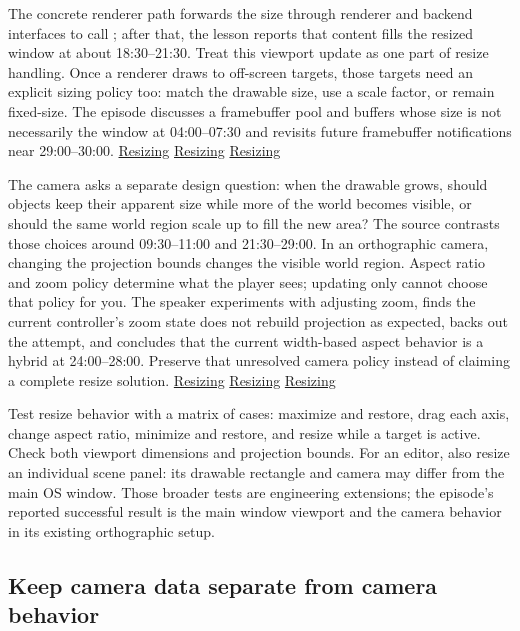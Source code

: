 The concrete renderer path forwards the size through renderer and backend interfaces to call ; after that, the lesson reports that content fills the resized window at about 18:30--21:30. Treat this viewport update as one part of resize handling. Once a renderer draws to off-screen targets, those targets need an explicit sizing policy too: match the drawable size, use a scale factor, or remain fixed-size. The episode discusses a framebuffer pool and buffers whose size is not necessarily the window at 04:00--07:30 and revisits future framebuffer notifications near 29:00--30:00. \href{https://www.youtube.com/watch?v=7LswjvgRqbw&t=1110s}{Resizing} \href{https://www.youtube.com/watch?v=7LswjvgRqbw&t=240s}{Resizing} \href{https://www.youtube.com/watch?v=7LswjvgRqbw&t=1740s}{Resizing}

The camera asks a separate design question: when the drawable grows, should objects keep their apparent size while more of the world becomes visible, or should the same world region scale up to fill the new area? The source contrasts those choices around 09:30--11:00 and 21:30--29:00. In an orthographic camera, changing the projection bounds changes the visible world region. Aspect ratio and zoom policy determine what the player sees; updating only  cannot choose that policy for you. The speaker experiments with adjusting zoom, finds the current controller's zoom state does not rebuild projection as expected, backs out the attempt, and concludes that the current width-based aspect behavior is a hybrid at 24:00--28:00. Preserve that unresolved camera policy instead of claiming a complete resize solution. \href{https://www.youtube.com/watch?v=7LswjvgRqbw&t=570s}{Resizing} \href{https://www.youtube.com/watch?v=7LswjvgRqbw&t=1290s}{Resizing} \href{https://www.youtube.com/watch?v=7LswjvgRqbw&t=1440s}{Resizing}

Test resize behavior with a matrix of cases: maximize and restore, drag each axis, change aspect ratio, minimize and restore, and resize while a target is active. Check both viewport dimensions and projection bounds. For an editor, also resize an individual scene panel: its drawable rectangle and camera may differ from the main OS window. Those broader tests are engineering extensions; the episode's reported successful result is the main window viewport and the camera behavior in its existing orthographic setup.

\subsection{Keep camera data separate from camera behavior}\label{06-engine-ii-ch026-keep-camera-data-separate-from-camera-behavior}

